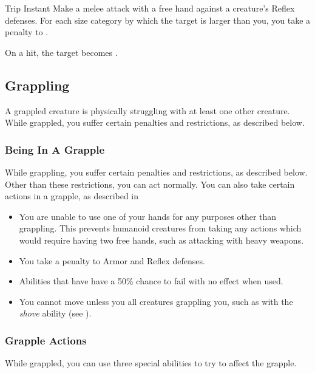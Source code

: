         \begin{instantability}{Trip}
            \label{Trip}
            Instant
            \rankline
            Make a melee attack with a free hand against a creature's Reflex defenses.
            For each size category by which the target is larger than you, you take a  penalty to .

            On a hit, the target becomes \prone.
        \end{instantability}

    \subsection{Grappling}\label{Grappling}
        A grappled creature is physically struggling with at least one other creature.
        While grappled, you suffer certain penalties and restrictions, as described below.

        \subsubsection{Being In A Grapple}
            While grappling, you suffer certain penalties and restrictions, as described below. Other than these restrictions, you can act normally. You can also take certain actions in a grapple, as described in 
            \begin{itemize}
                \item You are unable to use one of your hands for any purposes other than grappling.
                    This prevents humanoid creatures from taking any actions which would require having two free hands, such as attacking with heavy weapons.
                \item You take a  penalty to Armor and Reflex defenses.
                \item Abilities that have  have a 50\% chance to fail with no effect when used.
                \item You cannot move unless you  all creatures grappling you, such as with the \textit{shove} ability (see ).
            \end{itemize}

        \subsubsection{Grapple Actions}\label{Grapple Actions}
            While grappled, you can use three special abilities to try to affect the grapple.

